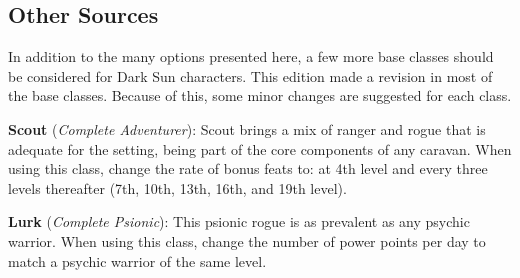 
\subsection{Other Sources}
In addition to the many options presented here, a few more base classes should be considered for {\tableheader Dark Sun} characters. This edition made a revision in most of the base classes. Because of this, some minor changes are suggested for each class.

\textbf{Scout} (\emph{Complete Adventurer}): Scout brings a mix of ranger and rogue that is adequate for the setting, being part of the core components of any caravan. When using this class, change the rate of bonus feats to: at 4th level and every three levels thereafter (7th, 10th, 13th, 16th, and 19th level).

\textbf{Lurk} (\emph{Complete Psionic}): This psionic rogue is as prevalent as any psychic warrior. When using this class, change the number of power points per day to match a psychic warrior of the same level.


\clearpage







% 



% 

\clearpage



